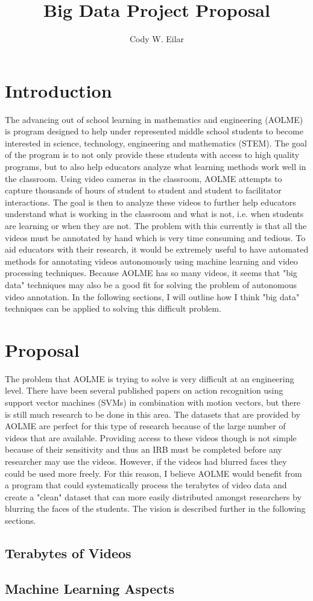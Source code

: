 \documentclass[11pt, twoside]{article}   	%
\title{Big Data Project Proposal}
\author{Cody W. Eilar}
\begin{document}
\maketitle
\section{Introduction}
The advancing out of school learning in mathematics and engineering (AOLME) is program designed to help under 
represented middle school students to become interested in science, technology, engineering and mathematics (STEM). The goal of
the program is to not only provide these students with access to high quality programs, but to also help educators analyze
what learning methods work well in the classroom. Using video cameras in the classroom, AOLME attempts to capture 
thousands of hours of student to student and student to facilitator interactions. The goal is then to analyze these videos
to further help educators understand what is working in the classroom and what is not, i.e. when students are learning or when they are not. The problem with this currently is that
all the videos must be annotated by hand which is very time consuming and tedious. To aid educators with their research, 
it would be extremely useful to have automated methods for annotating videos autonomously using machine learning and 
video processing techniques. Because AOLME has so many videos, it seems that "big data" techniques may also be a
good fit for solving the problem of autonomous video annotation. In the following sections, I will outline how I think
"big data" techniques can be applied to solving this difficult problem. 

\section{Proposal}
The problem that AOLME is trying to solve is very difficult at an engineering level. There have been several published
papers on action recognition using support vector machines (SVMs) in combination with motion vectors, but there is still
much research to be done in this area. The datasets that are provided by AOLME are perfect for this type of research because
of the large number of videos that are available. Providing access to these videos though is not simple because of their 
sensitivity and thus an IRB must be completed before any researcher may use the videos. However, if the videos had blurred 
faces they could be used more freely. For this reason, I believe AOLME would benefit from a program that could systematically 
process the terabytes of video data and create a "clean" dataset that can more easily distributed amongst researchers by 
blurring the faces of the students. The vision is described further in the following sections. 

\subsection{Terabytes of Videos} 
\subsection{Machine Learning Aspects}
\end{document}
